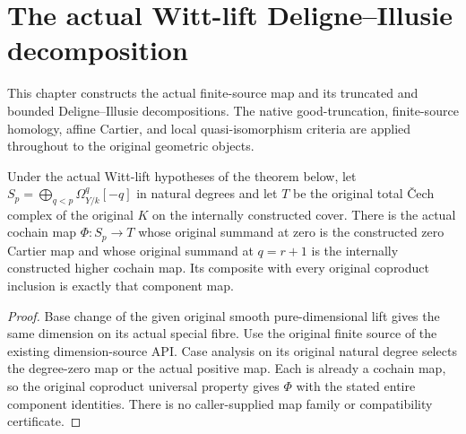 \section{The actual Witt-lift Deligne--Illusie decomposition}
\label{sec:di-actual-witt-decomposition}

This chapter constructs the actual finite-source map and its truncated
and bounded Deligne--Illusie decompositions. The native good-truncation,
finite-source homology, affine Cartier, and local quasi-isomorphism
criteria are applied throughout to the original geometric objects.

\begin{definition}
\label{def:di-actual-witt-finite-source-map}
\leanok
{}
Under the actual Witt-lift hypotheses of the theorem below, let
$S_p=\bigoplus_{q<p}\Omega^q_{Y/k}[-q]$ in natural degrees and let
$T$ be the original total \v Cech complex of the original $K$ on the
internally constructed cover. There is the actual cochain map
$\Phi:S_p\to T$ whose original summand at zero is the constructed zero
Cartier map and whose original summand at $q=r+1$ is the internally
constructed higher cochain map. Its composite with every original
coproduct inclusion is exactly that component map.
\end{definition}
\begin{proof}
\leanok
Base change of the given original smooth pure-dimensional lift gives the
same dimension on its actual special fibre. Use the original finite
source of the existing dimension-source API. Case analysis on its
original natural degree selects the degree-zero map or the actual positive map.
Each is already a cochain map, so the original coproduct universal
property gives $\Phi$ with the stated entire component identities.
There is no caller-supplied map family or compatibility certificate.
\end{proof}

